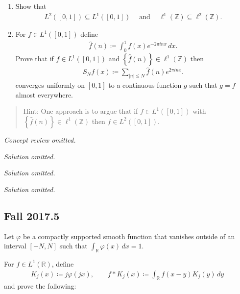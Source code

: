 \begin{problem}[?]

\envlist

\begin{enumerate}
\def\labelenumi{\alph{enumi}.}
\item
  Show that
  \begin{align*}
  L^2([0, 1]) \subseteq L^1([0, 1]) {\quad \operatorname{and} \quad} \ell^1({\mathbb{Z}}) \subseteq \ell^2({\mathbb{Z}})
  .\end{align*}
\item
  For \(f\in L^1([0, 1])\) define
  \begin{align*}
  \widehat{f}(n) \coloneqq\int _0^1 f(x) e^{-2\pi i n x} \, dx
  .\end{align*}
  Prove that if \(f\in L^1([0, 1])\) and
  \(\left\{{\widehat{f}(n)}\right\} \in \ell^1({\mathbb{Z}})\) then
  \begin{align*}
  S_N f(x) \coloneqq\sum_{{\left\lvert {n} \right\rvert} \leq N} \widehat{f} (n) e^{2 \pi i n x}
  .\end{align*}
  converges uniformly on \([0, 1]\) to a continuous function \(g\) such
  that \(g = f\) almost everywhere.
\end{enumerate}

\begin{quote}
Hint: One approach is to argue that if \(f\in L^1([0, 1])\) with
\(\left\{{\widehat{f} (n)}\right\} \in \ell^1({\mathbb{Z}})\) then
\(f\in L^2([0, 1])\).
\end{quote}

\end{problem}

\emph{Concept review omitted.}

\emph{Solution omitted.}

\emph{Solution omitted.}

\emph{Solution omitted.}

\hypertarget{fall-2017.5}{%
\subsection{Fall 2017.5}\label{fall-2017.5}}

Let \(\varphi\) be a compactly supported smooth function that vanishes
outside of an interval \([-N, N]\) such that
\(\int _{{\mathbb{R}}} \varphi(x) \, dx = 1\).

For \(f\in L^1({\mathbb{R}})\), define
\begin{align*}
K_{j}(x) \coloneqq j \varphi(j x), 
\qquad 
f \ast K_{j}(x) \coloneqq\int_{{\mathbb{R}}} f(x-y) K_{j}(y) \, dy
\end{align*}
and prove the following:

